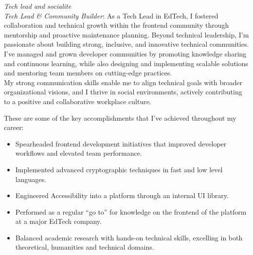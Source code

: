 \documentclass[9pt]{developercv} %
\begin{document}

\vspace{-5px}
\textcolor{BurntOrange}{\textit{Tech lead and socialite}}\\

\textit{Tech Lead \& Community Builder}: As a Tech Lead in EdTech, I fostered collaboration and technical growth within the frontend community through mentorship and proactive maintenance planning. Beyond technical leadership, I'm passionate about building strong, inclusive, and innovative technical communities. I've managed and grown developer communities by promoting knowledge sharing and continuous learning, while also designing and implementing scalable solutions and mentoring team members on cutting-edge practices.\\

My strong communication skills enable me to align technical goals with broader organizational visions, and I thrive in social environments, actively contributing to a positive and collaborative workplace culture.\\


These are some of the key accomplishments that I've achieved throughout my career:

\begin{itemize}
	\item Spearheaded frontend development initiatives that improved developer workflows and elevated team performance.
	\item Implemented advanced cryptographic techniques in fast and low level languages.
	\item Engineered Accessibility into a platform through an internal UI library.
	\item Performed as a regular “go to” for knowledge on the frontend of the platform at a major EdTech company.
	\item Balanced academic research with hands-on technical skills, excelling in both theoretical, humanities and technical domains.
\end{itemize}



\end{document}
